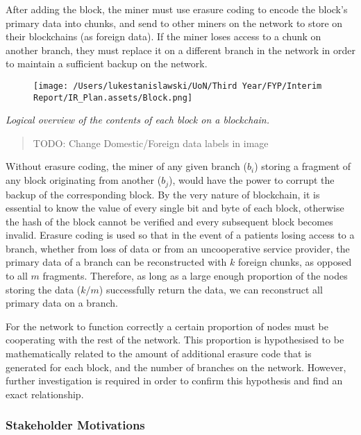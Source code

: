 \documentclass[]{article}
\begin{document}
After adding the block, the miner must use erasure coding to encode the
block's primary data into chunks, and send to other miners on the
network to store on their blockchains (as foreign data). If the miner
loses access to a chunk on another branch, they must replace it on a
different branch in the network in order to maintain a sufficient backup
on the network.

\begin{figure}
\centering
\texttt{[image: /Users/lukestanislawski/UoN/Third Year/FYP/Interim Report/IR\_Plan.assets/Block.png]}
\caption{}
\end{figure}

\emph{Logical overview of the contents of each block on a blockchain.}

\begin{quote}
TODO: Change Domestic/Foreign data labels in image
\end{quote}

Without erasure coding, the miner of any given branch (\(b_{i}\))
storing a fragment of any block originating from another (\(b_{j}\)),
would have the power to corrupt the backup of the corresponding block.
By the very nature of blockchain, it is essential to know the value of
every single bit and byte of each block, otherwise the hash of the block
cannot be verified and every subsequent block becomes invalid. Erasure
coding is used so that in the event of a patients losing access to a
branch, whether from loss of data or from an uncooperative service
provider, the primary data of a branch can be reconstructed with \(k\)
foreign chunks, as opposed to all \(m\) fragments. Therefore, as long as
a large enough proportion of the nodes storing the data (\(k/m\))
successfully return the data, we can reconstruct all primary data on a
branch.

For the network to function correctly a certain proportion of nodes must
be cooperating with the rest of the network. This proportion is
hypothesised to be mathematically related to the amount of additional
erasure code that is generated for each block, and the number of
branches on the network. However, further investigation is required in
order to confirm this hypothesis and find an exact relationship.

\hypertarget{header-n88}{%
\subsubsection{Stakeholder Motivations}\label{header-n88}}
\end{document}
